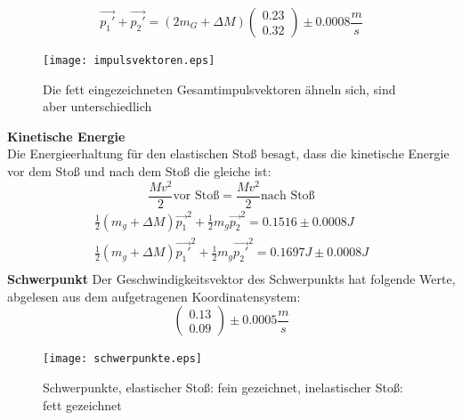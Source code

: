 \documentclass{article}
\begin{document}
\begin{equation}\label{impuls2}
\vec{p_1'} + \vec{p_2'} =(2m_G +\Delta M )\begin{pmatrix}
0.23 \\
0.32
\end{pmatrix} \pm 0.0008  \frac{m}{s}
\end{equation}
\begin{figure}[H]
\caption{Die fett eingezeichneten Gesamtimpulsvektoren ähneln sich, sind aber unterschiedlich}
\begin{center}
\texttt{[image: impulsvektoren.eps]}
\end{center}
\end{figure}


\textbf{Kinetische Energie}\\
Die Energieerhaltung für den elastischen Stoß besagt, dass die kinetische Energie vor dem Stoß und nach dem Stoß die gleiche ist:
\begin{equation}
\frac{Mv^2}{2} \text{vor Stoß} = \frac{Mv^2}{2}  \text{nach Stoß} 
\end{equation}
\begin{gather}
\frac{1}{2}(m_g+\Delta M)\vec{p_1}^2+\frac{1}{2}m_g \vec{p_2}^2=0.1516 \pm 0.0008 J \\
\frac{1}{2}(m_g+\Delta M)\vec{p_1'}^2+\frac{1}{2}m_g\vec{p_2'}^2=0.1697J \pm 0.0008 J \\
\end{gather}
\textbf{Schwerpunkt}
Der Geschwindigkeitsvektor des Schwerpunkts hat folgende Werte, abgelesen aus dem aufgetragenen Koordinatensystem: 
\begin{equation}
\begin{pmatrix*}
0.13 \\ 0.09 
\end{pmatrix*} \pm 0.0005 \frac{m}{s} 
\end{equation}
\begin{figure}[H]
\caption{Schwerpunkte, elastischer Stoß: fein gezeichnet, inelastischer Stoß: fett gezeichnet}
\begin{center}
\texttt{[image: schwerpunkte.eps]}
\end{center}
\end{figure}
\end{document}
